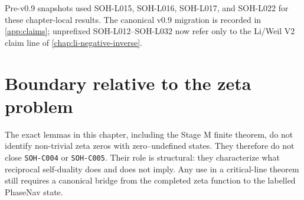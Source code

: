 Pre-v0.9 snapshots used SOH-L015, SOH-L016, SOH-L017, and SOH-L022 for these
chapter-local results. The canonical v0.9 migration is recorded in
\cref{app:claims}; unprefixed SOH-L012--SOH-L032 now refer only to the Li/Weil
V2 claim line of \cref{chap:li-negative-inverse}.

\section{Boundary relative to the zeta problem}

The exact lemmas in this chapter, including the Stage M finite theorem, do not
identify non-trivial zeta zeros with zero--undefined states. They therefore do
not close \texttt{SOH-C004} or \texttt{SOH-C005}. Their role is structural:
they characterize what reciprocal self-duality does and does not imply. Any
use in a critical-line theorem still requires a canonical bridge from the
completed zeta function to the labelled PhaseNav state.
